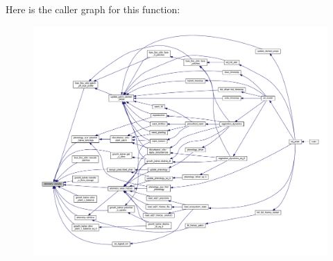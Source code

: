 Here is the caller graph for this function\+:\nopagebreak
\begin{figure}[H]
\begin{center}
\leavevmode
\includegraphics[width=350pt]{namespaceallometry_a45ced9bf9ccd03debe8def35b579f4bd_icgraph}
\end{center}
\end{figure}


